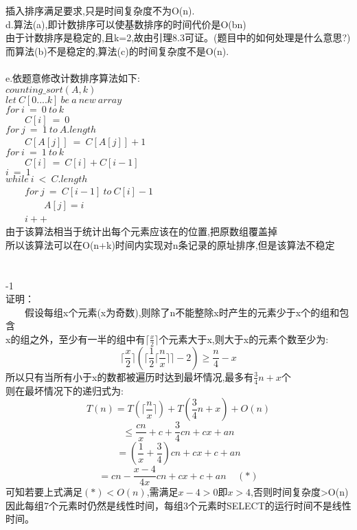\documentclass[19pt,a4paper]{article}
\begin{document}
\indent 插入排序满足要求,只是时间复杂度不为O(n).
\\
\indent d.算法(a),即计数排序可以使基数排序的时间代价是O(bn)\\
\indent 由于计数排序是稳定的,且k=2,故由引理8.3可证。(题目中的如何处理是什么意思?)\\
\indent 而算法(b)不是稳定的,算法(c)的时间复杂度不是O(n).\\
\\
\indent e.依题意修改计数排序算法如下:\\
\indent $counting\_sort(A,k)$\\
\indent $let\ C[0....k]\ be\ a\ new\ array$\\
\indent $for\ i\ =\ 0\ to\ k$\\
\indent \ \ \ \ $C[i]\ =\ 0$\\
\indent $for\ j\ =\ 1\ to\ A.length$\\
\indent \ \ \ \ $C[A[j]]\ =\ C[A[j]]+1$\\
\indent $for\ i\ =\ 1\ to\ k$\\
\indent \ \ \ \ $C[i]\ =\ C[i]+C[i-1]$\\
\indent $i\ =\ 1$\\
\indent $while\ i\ <\ C.length$\\
\indent \ \ \ \ $for\ j\ =\ C[i-1]\ to\ C[i]-1$\\
\indent \ \ \ \ \ \ \ \ $A[j]=i$\\
\indent\ \ \ \ $i++$\\
\indent 由于该算法相当于统计出每个元素应该在的位置,把原数组覆盖掉\\
\indent 所以该算法可以在O(n+k)时间内实现对n条记录的原址排序,但是该算法不稳定\\
\\
\\
-1\\
\indent 证明：\\
\indent \ \ \ \ 假设每组x个元素(x为奇数),则除了n不能整除x时产生的元素少于x个的组和包含\\
\indent x的组之外，至少有一半的组中有$\lceil\frac{x}{2}\rceil$个元素大于x,则大于x的元素个数至少为:
$$\lceil\frac{x}{2}\rceil(\lceil\frac{1}{2}\lceil\frac{n}{x}\rceil\rceil-2)\ge\frac{n}{4}-x$$
\indent 所以只有当所有小于x的数都被遍历时达到最坏情况,最多有$\frac{3}{4}n+x$个\\
\indent 则在最坏情况下的递归式为:
$$T(n)=T(\lceil\frac{n}{x}\rceil)+T(\frac{3}{4}n+x)+O(n)$$
$$\le\frac{cn}{x}+c+\frac{3}{4}cn+cx+an$$
$$=(\frac{1}{x}+\frac{3}{4})cn+cx+c+an$$
$$=cn-\frac{x-4}{4x}cn+cx+c+an\ \ \ \ \ (*)$$
\indent 可知若要上式满足$(*)<O(n)$,需满足$x-4>0$即$x>4$,否则时间复杂度>O(n)\\
\indent 因此每组7个元素时仍然是线性时间，每组3个元素时SELECT的运行时间不是线性时间。
\end{document}
